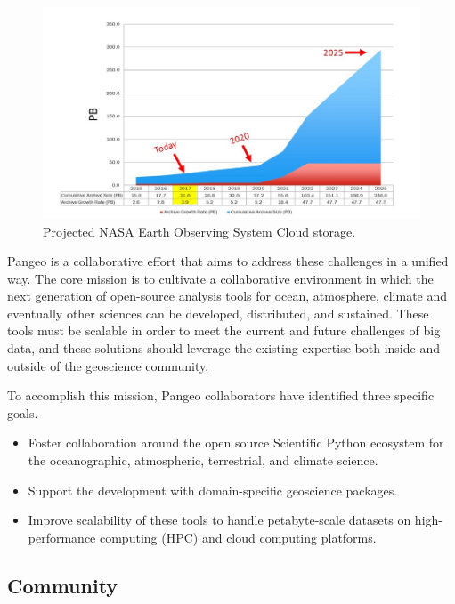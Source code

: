 \documentclass{article}
\begin{document}
\begin{figure}
  \centering
  \includegraphics[width=\columnwidth]{EOSDIS_archive_growth_updated_resize.jpg}
  \caption{\label{nasa_cloud_growth} Projected NASA Earth Observing System Cloud storage\cite{b2}.}
\end{figure}


Pangeo is a collaborative effort that aims to address these challenges in a unified way.
The core mission is to cultivate a collaborative environment in which the next generation of open-source analysis tools for ocean, atmosphere, climate and eventually other sciences can be developed, distributed, and sustained. These tools must be scalable in order to meet the current and future challenges of big data, and these solutions should leverage the existing expertise both inside and outside of the geoscience community.

To accomplish this mission, Pangeo collaborators have identified three specific goals.

\begin{itemize}
\item Foster collaboration around the open source Scientific Python ecosystem for the oceanographic, atmospheric, terrestrial, and climate science.
\item Support the development with domain-specific geoscience packages.
\item Improve scalability of these tools to handle petabyte-scale datasets on high-performance computing (HPC) and cloud computing platforms.
\end{itemize}

\subsection{Community}
\label{ssec:community}
\end{document}

